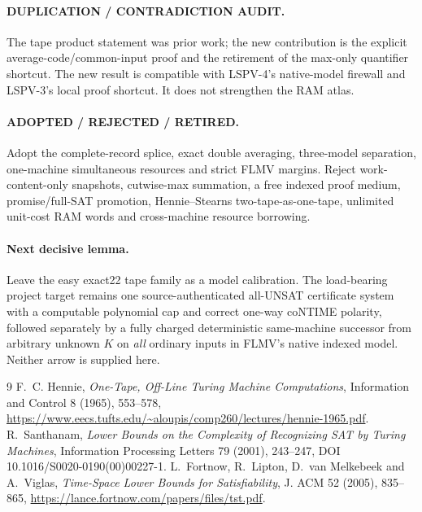 \documentclass[11pt]{article}
\begin{document}
\paragraph{DUPLICATION / CONTRADICTION AUDIT.}
The tape product statement was prior work; the new contribution is the explicit average-code/common-input proof and the retirement of the max-only quantifier shortcut.  The new result is compatible with LSPV-4's native-model firewall and LSPV-3's local proof shortcut.  It does not strengthen the RAM atlas.

\paragraph{ADOPTED / REJECTED / RETIRED.}
Adopt the complete-record splice, exact double averaging, three-model separation, one-machine simultaneous resources and strict FLMV margins.  Reject work-content-only snapshots, cutwise-max summation, a free indexed proof medium, promise/full-SAT promotion, Hennie--Stearns two-tape-as-one-tape, unlimited unit-cost RAM words and cross-machine resource borrowing.

\paragraph{Next decisive lemma.}
Leave the easy exact22 tape family as a model calibration.  The load-bearing project target remains one source-authenticated all-UNSAT certificate system with a computable polynomial cap and correct one-way coNTIME polarity, followed separately by a fully charged deterministic same-machine successor from arbitrary unknown $K$ on \emph{all} ordinary inputs in FLMV's native indexed model.  Neither arrow is supplied here.

\begin{thebibliography}{9}\small
{} F.~C. Hennie, \emph{One-Tape, Off-Line Turing Machine Computations}, Information and Control 8 (1965), 553--578, \url{https://www.eecs.tufts.edu/~aloupis/comp260/lectures/hennie-1965.pdf}.
 R.~Santhanam, \emph{Lower Bounds on the Complexity of Recognizing SAT by Turing Machines}, Information Processing Letters 79 (2001), 243--247, DOI 10.1016/S0020-0190(00)00227-1.
 L.~Fortnow, R.~Lipton, D.~van Melkebeek and A.~Viglas, \emph{Time-Space Lower Bounds for Satisfiability}, J. ACM 52 (2005), 835--865, \url{https://lance.fortnow.com/papers/files/tst.pdf}.
\end{thebibliography}
\end{document}
